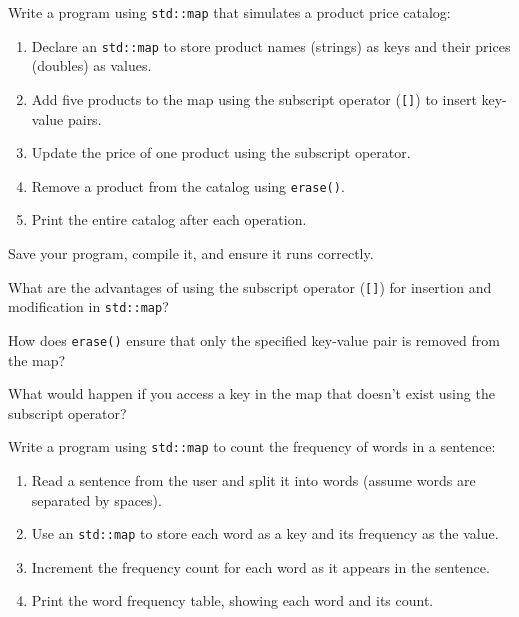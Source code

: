 \begin{challenge}
    \begin{task}
        Write a program using \texttt{std::map} that simulates a product price catalog:
        \begin{enumerate}
            \item Declare an \texttt{std::map} to store product names (strings) as keys and their prices (doubles) as values.
            \item Add five products to the map using the subscript operator (\texttt{[]}) to insert key-value pairs.
            \item Update the price of one product using the subscript operator.
            \item Remove a product from the catalog using \texttt{erase()}.
            \item Print the entire catalog after each operation.
        \end{enumerate}

        Save your program, compile it, and ensure it runs correctly.

        \begin{questions}
            \item What are the advantages of using the subscript operator (\texttt{[]}) for insertion and modification in \texttt{std::map}?
            \item How does \texttt{erase()} ensure that only the specified key-value pair is removed from the map?
            \item What would happen if you access a key in the map that doesn’t exist using the subscript operator?
        \end{questions}
    \end{task}

    \begin{task}
        Write a program using \texttt{std::map} to count the frequency of words in a sentence:
        \begin{enumerate}
            \item Read a sentence from the user and split it into words (assume words are separated by spaces).
            \item Use an \texttt{std::map} to store each word as a key and its frequency as the value.
            \item Increment the frequency count for each word as it appears in the sentence.
            \item Print the word frequency table, showing each word and its count.
        \end{enumerate}


\end{task}
\end{challenge}
